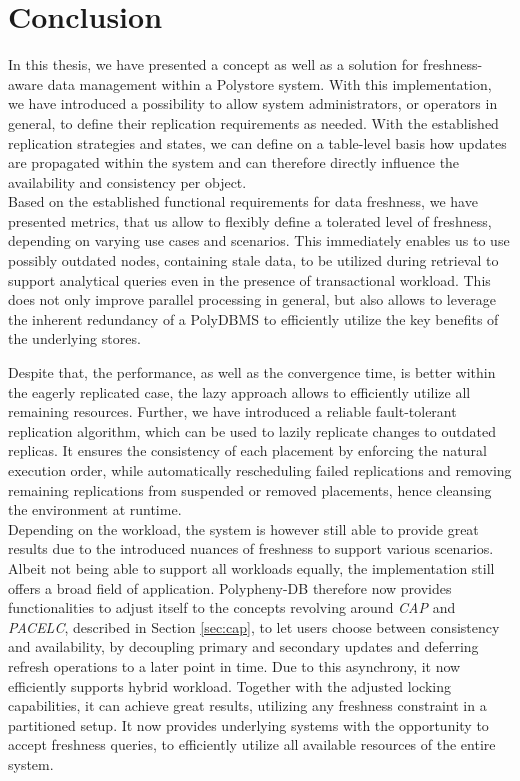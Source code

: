 \chapter{Conclusion}
\label{c:conclusion}

In this thesis, we have presented a concept as well as a solution for freshness-aware data management within a Polystore system.
With this implementation, we have introduced a possibility to allow system administrators, or operators in general, to define their replication requirements as needed. 
With the established replication strategies and states, we can define on a table-level basis how updates are propagated within the system and can therefore directly influence 
the availability and consistency per object.\\
Based on the established functional requirements for data freshness, we have presented metrics, that us allow to flexibly define a tolerated level of freshness, 
depending on varying use cases and scenarios.
This immediately enables us to use possibly outdated nodes, containing stale data, to be utilized during retrieval to support analytical queries even in the presence of 
transactional workload.
This does not only improve parallel processing in general, but also allows to leverage the inherent redundancy of a PolyDBMS
to efficiently utilize the key benefits of the underlying stores.



Despite that, the performance, as well as the convergence time, is better within the eagerly replicated case, 
the lazy approach allows to efficiently utilize all remaining resources.
Further, we have introduced a reliable fault-tolerant replication algorithm, which can be used to lazily replicate changes to outdated replicas.
It ensures the consistency of each placement by enforcing the natural execution order, while automatically rescheduling failed replications 
and removing remaining replications from suspended or removed placements, hence cleansing the environment at runtime.\\



Depending on the workload, the system is however still able to provide great results due to the introduced nuances of freshness to support various scenarios.
Albeit not being able to support all workloads equally, the implementation still offers a broad field of application.
Polypheny-DB therefore now provides functionalities to adjust itself to the concepts revolving around \emph{CAP} and \emph{PACELC}, described in Section \ref{sec:cap},
to let users choose between consistency and availability, by decoupling primary and secondary updates and deferring refresh operations to a later point in time.
Due to this asynchrony, it now efficiently supports hybrid workload. 
Together with the adjusted locking capabilities, it can achieve great results, utilizing any freshness constraint in a partitioned setup.
It now provides underlying systems with the opportunity to accept freshness queries, to efficiently utilize all available resources of the entire system.



